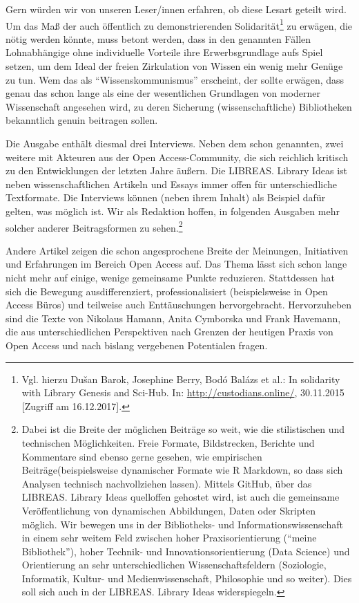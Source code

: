 \documentclass[a4paper,
fontsize=11pt,
oneside,
numbers=noperiodatend,
parskip=half-,
bibliography=totoc,
final
]{scrartcl}
\begin{document}
Gern würden wir von unseren Leser/innen erfahren, ob diese Lesart
geteilt wird. Um das Maß der auch öffentlich zu demonstrierenden
Solidarität\footnote{Vgl. hierzu Dušan Barok, Josephine Berry, Bodó
  Balázs et al.: In solidarity with Library Genesis and Sci-Hub. In:
  \url{http://custodians.online/}, 30.11.2015 {[}Zugriff am
  16.12.2017{]}.} zu erwägen, die nötig werden könnte, muss betont
werden, dass in den genannten Fällen Lohnabhängige ohne individuelle
Vorteile ihre Erwerbsgrundlage aufs Spiel setzen, um dem Ideal der
freien Zirkulation von Wissen ein wenig mehr Genüge zu tun. Wem das als
\enquote{Wissenskommunismus} erscheint, der sollte erwägen, dass genau
das schon lange als eine der wesentlichen Grundlagen von moderner
Wissenschaft angesehen wird, zu deren Sicherung (wissenschaftliche)
Bibliotheken bekanntlich genuin beitragen sollen.

Die Ausgabe enthält diesmal drei Interviews. Neben dem schon genannten,
zwei weitere mit Akteuren aus der Open Access-Community, die sich
reichlich kritisch zu den Entwicklungen der letzten Jahre äußern. Die
LIBREAS. Library Ideas ist neben wissenschaftlichen Artikeln und Essays
immer offen für unterschiedliche Textformate. Die Interviews können
(neben ihrem Inhalt) als Beispiel dafür gelten, was möglich ist. Wir als
Redaktion hoffen, in folgenden Ausgaben mehr solcher anderer
Beitragsformen zu sehen.\footnote{Dabei ist die Breite der möglichen
  Beiträge so weit, wie die stilistischen und technischen Möglichkeiten.
  Freie Formate, Bildstrecken, Berichte und Kommentare sind ebenso gerne
  gesehen, wie empirischen Beiträge(beispielsweise dynamischer Formate
  wie R Markdown, so dass sich Analysen technisch nachvollziehen
  lassen). Mittels GitHub, über das LIBREAS. Library Ideas quelloffen
  gehostet wird, ist auch die gemeinsame Veröffentlichung von
  dynamischen Abbildungen, Daten oder Skripten möglich. Wir bewegen uns
  in der Bibliotheks- und Informationswissenschaft in einem sehr weitem
  Feld zwischen hoher Praxisorientierung (\enquote{meine Bibliothek}),
  hoher Technik- und Innovationsorientierung (Data Science) und
  Orientierung an sehr unterschiedlichen Wissenschaftsfeldern
  (Soziologie, Informatik, Kultur- und Medienwissenschaft, Philosophie
  und so weiter). Dies soll sich auch in der LIBREAS. Library Ideas
  widerspiegeln.}

Andere Artikel zeigen die schon angesprochene Breite der Meinungen,
Initiativen und Erfahrungen im Bereich Open Access auf. Das Thema lässt
sich schon lange nicht mehr auf einige, wenige gemeinsame Punkte
reduzieren. Stattdessen hat sich die Bewegung ausdifferenziert,
professionalisiert (beispielsweise in Open Access Büros) und teilweise
auch Enttäuschungen hervorgebracht. Hervorzuheben sind die Texte von
Nikolaus Hamann, Anita Cymborska und Frank Havemann, die aus
unterschiedlichen Perspektiven nach Grenzen der heutigen Praxis von Open
Access und nach bislang vergebenen Potentialen fragen.
\end{document}

